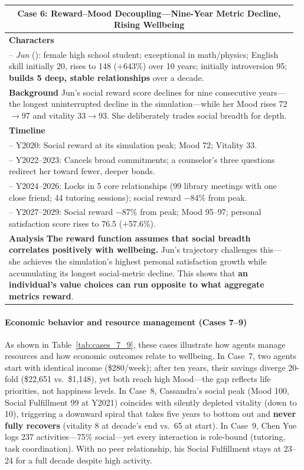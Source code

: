 \begin{table}[htbp]
\begin{tabular}{p{0.97\linewidth}}
\multicolumn{1}{c}{\textbf{Case 6: Reward--Mood Decoupling---Nine-Year Metric Decline, Rising Wellbeing}}\\
\midrule
\textbf{Characters}\\
\quad -- \textit{Jun} (\campus{}): female high school student;
  exceptional in math/physics;
  English skill initially 20, rises to 148 ($+$643\%) over 10 years;
  initially introversion 95;
  \textbf{builds 5 deep, stable relationships} over a decade.\\[2pt]
\textbf{Background}\quad
Jun's social reward score declines for nine consecutive years---the longest
uninterrupted decline in the simulation---while her Mood rises 72$\to$97 and vitality
33$\to$93.
She deliberately trades social breadth for depth.\\[2pt]
\textbf{Timeline}\\
\quad -- Y2020: Social reward at its simulation peak;
  Mood 72; Vitality 33.\\
\quad -- Y2022--2023: Cancels broad commitments;
  a counselor's three questions redirect her toward fewer, deeper bonds.\\
\quad -- Y2024--2026: Locks in 5 core relationships
  (99 library meetings with one close friend; 44 tutoring sessions);
  social reward $-$84\% from peak.\\
\quad -- Y2027--2029: Social reward $-$87\% from peak;
  Mood 95--97; personal satisfaction score rises to 76.5 ($+$57.6\%).\\[2pt]
\textbf{Analysis}\quad
\textbf{The reward function assumes that social breadth correlates positively with wellbeing.}
Jun's trajectory challenges this---she achieves the simulation's highest personal
satisfaction growth while accumulating its longest social-metric decline.
This shows that \textbf{an individual's value choices can run opposite to what aggregate metrics reward}.\\

\bottomrule
\end{tabular}
\end{table}


\paragraph{Economic behavior and resource management (Cases 7--9)}
As shown in Table~\ref{tab:cases_7_9}, these cases illustrate how agents manage resources and how economic outcomes relate to wellbeing.
In Case~7, two agents start with identical income (\$280/week);
after ten years, their savings diverge 20-fold (\$22,651 vs.\ \$1,148),
yet both reach high Mood---the gap reflects life priorities, not happiness levels.
In Case~8, Cassandra's social peak (Mood 100, Social Fulfillment 99 at Y2021) coincides with silently depleted vitality (down to 10),
triggering a downward spiral that takes five years to bottom out
and \textbf{never fully recovers} (vitality 8 at decade's end vs.\ 65 at start).
In Case~9, Chen Yue logs 237 activities---75\% social---yet every interaction is role-bound (tutoring, task coordination).
With no peer relationship, his Social Fulfillment stays at 23--24 for a full decade despite high activity.

